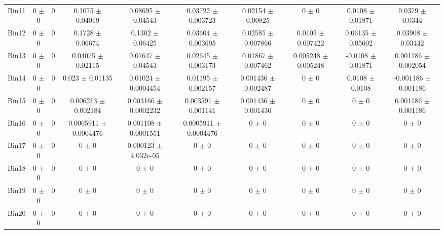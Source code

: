 \begin{tabular}{@{\extracolsep{4pt}}lccccccccc@{}}
     Bin11 & 0 $\pm$ 0 & 0 & 0.1075 $\pm$ 0.04019 & 0.08695 $\pm$ 0.04543 & 0.03722 $\pm$ 0.003723 & 0.02154 $\pm$ 0.00825 & 0 $\pm$ 0 & 0.0108 $\pm$ 0.01871 & 0.0379 $\pm$ 0.0344 \\ 
     Bin12 & 0 $\pm$ 0 & 0 & 0.1728 $\pm$ 0.06674 & 0.1302 $\pm$ 0.06425 & 0.03604 $\pm$ 0.003695 & 0.02585 $\pm$ 0.007866 & 0.0105 $\pm$ 0.007422 & 0.06135 $\pm$ 0.05602 & 0.03908 $\pm$ 0.03442 \\ 
     Bin13 & 0 $\pm$ 0 & 0 & 0.04075 $\pm$ 0.02115 & 0.07647 $\pm$ 0.04543 & 0.02645 $\pm$ 0.003173 & 0.01867 $\pm$ 0.007462 & 0.005248 $\pm$ 0.005248 & -0.0108 $\pm$ 0.01871 & 0.001186 $\pm$ 0.002054 \\ 
     Bin14 & 0 $\pm$ 0 & 0 & 0.023 $\pm$ 0.01135 & 0.01024 $\pm$ 0.0004454 & 0.01195 $\pm$ 0.002157 & 0.001436 $\pm$ 0.002487 & 0 $\pm$ 0 & 0.0108 $\pm$ 0.0108 & -0.001186 $\pm$ 0.001186 \\ 
     Bin15 & 0 $\pm$ 0 & 0 & 0.006213 $\pm$ 0.002184 & 0.003166 $\pm$ 0.0002232 & 0.003591 $\pm$ 0.001141 & 0.001436 $\pm$ 0.001436 & 0 $\pm$ 0 & 0 $\pm$ 0 & 0.001186 $\pm$ 0.001186 \\ 
     Bin16 & 0 $\pm$ 0 & 0 & 0.0005911 $\pm$ 0.0004476 & 0.001108 $\pm$ 0.0001551 & 0.0005911 $\pm$ 0.0004476 & 0 $\pm$ 0 & 0 $\pm$ 0 & 0 $\pm$ 0 & 0 $\pm$ 0 \\ 
     Bin17 & 0 $\pm$ 0 & 0 & 0 $\pm$ 0 & 0.000123 $\pm$ 4.032e-05 & 0 $\pm$ 0 & 0 $\pm$ 0 & 0 $\pm$ 0 & 0 $\pm$ 0 & 0 $\pm$ 0 \\ 
     Bin18 & 0 $\pm$ 0 & 0 & 0 $\pm$ 0 & 0 $\pm$ 0 & 0 $\pm$ 0 & 0 $\pm$ 0 & 0 $\pm$ 0 & 0 $\pm$ 0 & 0 $\pm$ 0 \\ 
     Bin19 & 0 $\pm$ 0 & 0 & 0 $\pm$ 0 & 0 $\pm$ 0 & 0 $\pm$ 0 & 0 $\pm$ 0 & 0 $\pm$ 0 & 0 $\pm$ 0 & 0 $\pm$ 0 \\ 
     Bin20 & 0 $\pm$ 0 & 0 & 0 $\pm$ 0 & 0 $\pm$ 0 & 0 $\pm$ 0 & 0 $\pm$ 0 & 0 $\pm$ 0 & 0 $\pm$ 0 & 0 $\pm$ 0 \\ 
\hline\hline
  \end{tabular}

